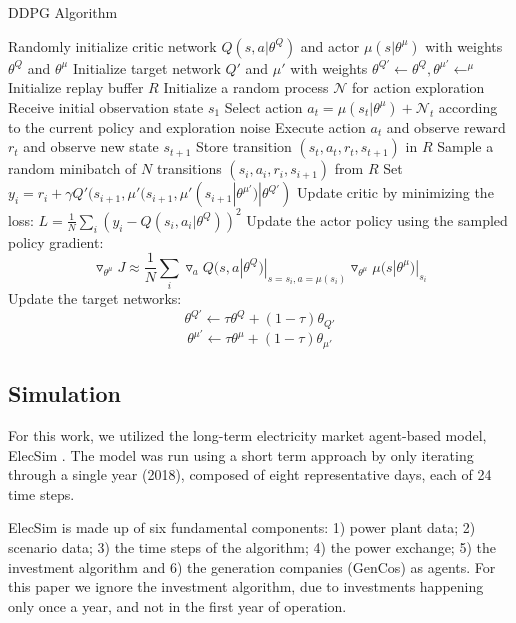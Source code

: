 \documentclass[conference]{IEEEtran}
\begin{document}
\begin{algorithm}
\caption{DDPG Algorithm \cite{Hunt2016}}
\begin{algorithmic}[1]
  \footnotesize
  \STATE Randomly initialize critic network $Q(s,a|\theta^Q)$ and actor $\mu(s|\theta^\mu)$ with weights $\theta^Q$ and $\theta^\mu$
  \STATE Initialize target network $Q'$ and $\mu'$ with weights $\theta^{Q'}\leftarrow\theta^Q,\theta^{\mu'}\leftarrow^{\mu}$
  \STATE Initialize replay buffer $R$
        \STATE Initialize a random process $\mathcal{N}$ for action exploration
        \STATE Receive initial observation state $s_1$
        	\STATE Select action $a_t=\mu(s_t|\theta^{\mu})+\mathcal{N}_t$ according to the current policy and exploration noise
        	\STATE Execute action $a_t$ and observe reward $r_t$ and observe new state $s_{t+1}$
        	\STATE Store transition $(s_t, a_t, r_t, s_{t+1})$ in $R$
        	\STATE Sample a random minibatch of $N$ transitions $(s_i, a_i, r_i, s_{i+1})$ from $R$
        	\STATE Set $y_i=r_i+\gamma Q'(s_{i+1},\mu'(s_{i+1},\mu'(s_{i+1}|\theta^{\mu'})|\theta^{Q'})$
        	\STATE Update critic by minimizing the loss: $L=\frac{1}{N}\sum_i(y_i-Q(s_i,a_i|\theta^Q))^2$
        	\STATE Update the actor policy using the sampled policy gradient: $$\triangledown_{\theta^\mu}J\approx \frac{1}{N}\sum_i\triangledown_a Q(s,a|\theta^Q)|_{s=s_i,a=\mu(s_i)}\triangledown_{\theta^\mu}\mu(s|\theta^\mu)|_{s_i}$$
        	\STATE Update the target networks:
        	$$\theta^{Q'}\leftarrow\tau\theta^Q+(1-\tau)\theta_{Q'}$$
        	$$\theta^{\mu'}\leftarrow\tau\theta^\mu+(1-\tau)\theta_{\mu'}$$
        \ENDFOR
      \ENDFOR
\end{algorithmic}
\end{algorithm}

\subsection{Simulation}

For this work, we utilized the long-term electricity market agent-based model, ElecSim \cite{Kell,Kell2020b}. The model was run using a short term approach by only iterating through a single year (2018), composed of eight representative days, each of 24 time steps.

ElecSim is made up of six fundamental components: 1) power plant data; 2) scenario data; 3) the time steps of the algorithm; 4) the power exchange; 5) the investment algorithm and 6) the generation companies (GenCos) as agents. For this paper we ignore the investment algorithm, due to investments happening only once a year, and not in the first year of operation. 
\end{document}
